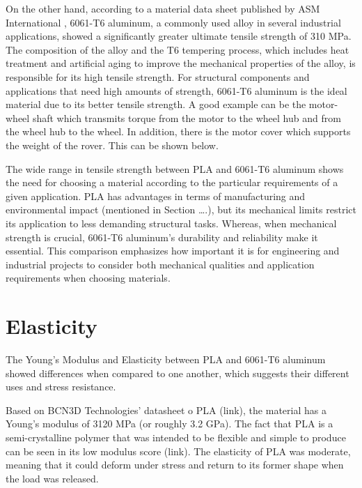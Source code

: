     On the other hand, according to a material data sheet published by ASM International %
    , 6061-T6 aluminum, a commonly used alloy in several industrial applications, showed a significantly greater
    ultimate tensile strength of 310 MPa. The composition of the alloy and the T6 tempering process, which
    includes heat treatment and artificial aging to improve the mechanical properties of the alloy, is responsible for its high tensile strength. For structural components and applications that need high
    amounts of strength, 6061-T6 aluminum is the ideal material due to its better tensile strength. A good
    example can be the motor-wheel shaft which transmits torque from the motor to the wheel hub and from
    the wheel hub to the wheel. In addition, there is the motor cover which supports the weight of the rover.
    This can be shown below.


    The wide range in tensile strength between PLA and 6061-T6 aluminum shows the need for choosing a material according to the particular requirements of a given application. PLA has advantages in terms of
    manufacturing and environmental impact (mentioned in Section ….), but its mechanical limits restrict its
    application to less demanding structural tasks. Whereas, when mechanical strength is crucial, 6061-T6
    aluminum's durability and reliability make it essential. This comparison emphasizes how important it is
    for engineering and industrial projects to consider both mechanical qualities and application requirements when choosing materials.

\section{Elasticity}

    The Young's Modulus and Elasticity between PLA and 6061-T6 aluminum showed differences when
    compared to one another, which suggests their different uses and stress resistance.

    Based on BCN3D Technologies' datasheet o PLA (link), the material has a Young's modulus of 3120 MPa (or
    roughly 3.2 GPa). The fact that PLA is a semi-crystalline polymer that was intended to be flexible and
    simple to produce can be seen in its low modulus score (link). The elasticity of PLA was moderate,
    meaning that it could deform under stress and return to its former shape when the load was released.

